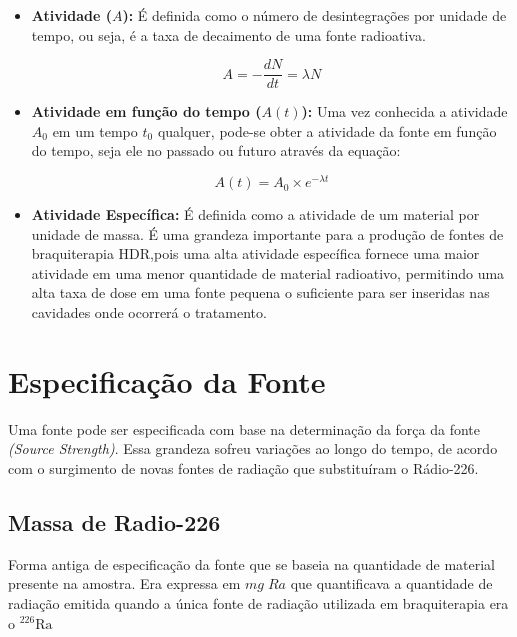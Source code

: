 \documentclass[11pt,a4paper]{article}
\begin{document}
\begin{itemize}
			\item \textbf{Atividade ($A$): } É definida como o número de desintegrações por unidade de tempo, ou seja, é a taxa de decaimento de uma fonte radioativa. 
				
				\begin{equation}
					A = -\frac{dN}{dt} = \lambda N
				\end{equation}

			\item \textbf{Atividade em função do tempo ($A(t)$): } Uma vez conhecida a atividade $A_0$ em um tempo $t_0$ qualquer, pode-se obter a atividade da fonte em função do tempo, seja ele no passado ou futuro através da equação:
				
				\begin{equation}
					A(t) = A_0 \times e^{-\lambda t}
					\label{eq:AtividadeNoTempo}
				\end{equation}

			\item \textbf{Atividade Específica: } É definida como a atividade de um material por unidade de massa. É uma grandeza importante para a produção de fontes de braquiterapia HDR,pois uma alta atividade específica fornece uma maior atividade em uma menor quantidade de material radioativo, permitindo uma alta taxa de dose em uma fonte pequena o suficiente para ser inseridas nas cavidades onde ocorrerá o tratamento.

		\end{itemize}

	\section{Especificação da Fonte}
		
		Uma fonte pode ser especificada com base na determinação da força da fonte \textit{(Source Strength)}. Essa grandeza sofreu variações ao longo do tempo, de acordo com o surgimento de novas fontes de radiação que substituíram o Rádio-226. 

		\subsection{Massa de Radio-226}

			Forma antiga de especificação da fonte que se baseia na quantidade de material presente na amostra. Era expressa em $mg\; Ra$ que quantificava a quantidade de radiação emitida quando a única fonte de radiação utilizada em braquiterapia era o $\mathrm{{}^{226}Ra}$
\end{document}

